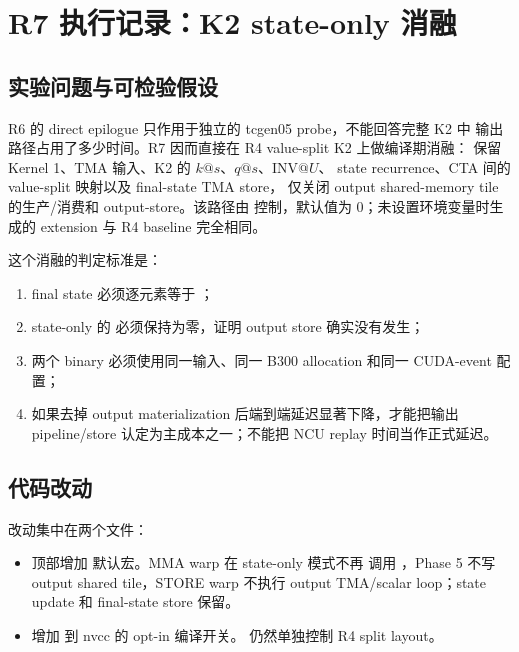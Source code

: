 \section{R7 执行记录：K2 state-only 消融}

\subsection{实验问题与可检验假设}

R6 的 direct epilogue 只作用于独立的 tcgen05 probe，不能回答完整 K2 中
输出路径占用了多少时间。R7 因而直接在 R4 value-split K2 上做编译期消融：
保留 Kernel 1、TMA 输入、K2 的 \(k@s\)、\(q@s\)、\(\mathrm{INV}@U\)、
state recurrence、CTA 间的 value-split 映射以及 final-state TMA store，
仅关闭 output shared-memory tile 的生产/消费和 output-store。该路径由
 控制，默认值为 0；未设置环境变量时生成的
extension 与 R4 baseline 完全相同。

这个消融的判定标准是：

\begin{enumerate}
  \item final state 必须逐元素等于 ；
  \item state-only 的  必须保持为零，证明 output store 确实没有发生；
  \item 两个 binary 必须使用同一输入、同一 B300 allocation 和同一 CUDA-event
        配置；
  \item 如果去掉 output materialization 后端到端延迟显著下降，才能把输出
        pipeline/store 认定为主成本之一；不能把 NCU replay 时间当作正式延迟。
\end{enumerate}

\subsection{代码改动}

改动集中在两个文件：

\begin{itemize}
  \item {} 顶部增加
         默认宏。MMA warp 在 state-only 模式不再
        调用 ，Phase 5 不写 output
        shared tile，STORE warp 不执行 output TMA/scalar loop；state update
        和 final-state store 保留。
  \item {} 增加
         到 nvcc 的 opt-in 编译开关。
         仍然单独控制 R4 split layout。
\end{itemize}


